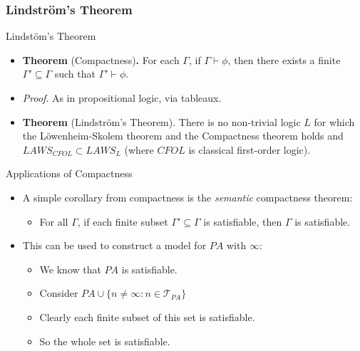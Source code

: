 \documentclass[../slides.tex]{subfiles}
\begin{document}
\subsubsection{Lindstr\"om's Theorem}
\begin{frame}{Lindst\"om's Theorem}

  \begin{itemize}

  \item \textbf{Theorem} (Compactness)\textbf{.} For each $\Gamma$, if
    $\Gamma\vdash\phi$, then there exists a finite
    $\Gamma'\subseteq\Gamma$ such that $\Gamma'\vdash\phi$.

  \item \emph{Proof}. As in propositional logic, via tableaux.

   \item \textbf{Theorem} (Lindstr\"om's Theorem). There is no
     non-trivial logic $L$ for which the L\"owenheim-Skolem theorem
     and the Compactness theorem holds and $LAWS_{CFOL}\subset
     LAWS_L$ (where $CFOL$ is classical first-order logic).
    
  \end{itemize}
  
\end{frame}

\begin{frame}{Applications of Compactness}

  \begin{itemize}
  \item A simple corollary from compactness is the \emph{semantic}
    compactness theorem:
    \begin{itemize}
    \item For all $\Gamma$, if each finite subset
      $\Gamma'\subseteq\Gamma$ is satisfiable, then $\Gamma$ is satisfiable.
    \end{itemize}

    \item This can be used to construct a model for $PA$ with
      $\infty$:

      \begin{itemize}
      \item We know that $PA$ is satisfiable.
      \item Consider $PA\cup\{n\neq \infty:n\in\mathcal{T}_{PA}\}$
      \item Clearly each finite subset of this set is satisfiable.
      \item So the whole set is satisfiable.
        
      \end{itemize}
  \end{itemize}
  
\end{frame}
\end{document}
